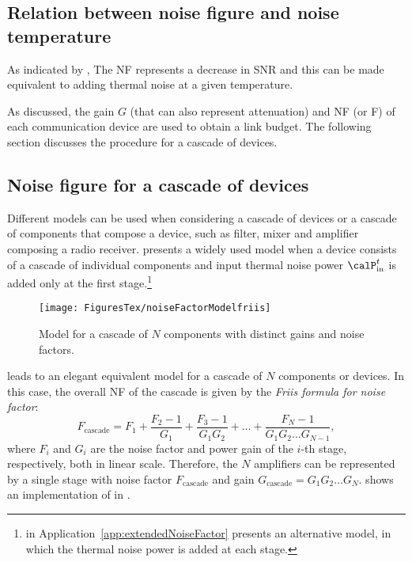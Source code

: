 \subsection{Relation between noise figure and noise temperature}

As indicated by , The NF represents a decrease in SNR and this can
be made equivalent to adding thermal noise at a given temperature.

As discussed, the gain $G$ (that can also represent attenuation) and NF (or F) of each communication device are used to obtain a link budget. The following section discusses the procedure for a cascade of devices.

\subsection{Noise figure for a cascade of devices}

Different models can be used when considering a cascade of devices or a cascade
of components that compose a device, such as filter, mixer and amplifier composing
a radio receiver.
 presents a widely used model when a device
consists of a cascade of individual components and input thermal noise power $\calP_{\textrm{in}}^{t}$ is added only at the first stage.\footnote{ in
Application~\ref{app:extendedNoiseFactor} presents an alternative model, in which the
thermal noise power is added at each stage.}

\begin{figure}[htbp]
	\centering
		\texttt{[image: FiguresTex/noiseFactorModelfriis]}		
	\caption{Model for a cascade of $N$ components with distinct gains and noise factors.\label{fig:noiseFactorModelfriis}}
\end{figure}

 leads to an elegant equivalent model for a cascade of $N$ components or devices. In this case, the overall NF of the cascade is given by the \emph{Friis formula for noise factor}:
\begin{equation}
F_{\textrm{cascade}} = F_1 + \frac{F_2-1}{G_1} + \frac{F_3-1}{G_1G_2} + \ldots + \frac{F_N-1}{G_1G_2 \ldots G_{N-1}},
\label{eq:friisNoiseFactor}
\end{equation}
where $F_i$ and $G_i$ are the noise factor and power gain of the $i$-th stage, respectively, both in linear scale. Therefore, the $N$ amplifiers can be represented by a single stage with noise factor $F_{\textrm{cascade}}$ and gain $G_{\textrm{cascade}}=G_1G_2 \ldots G_N$.
 shows an implementation of  in {\matlab}.

